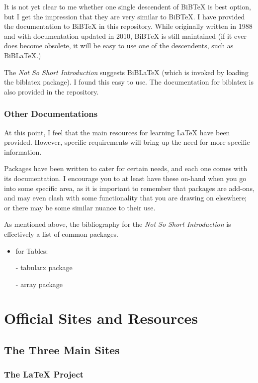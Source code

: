 \documentclass[11pt, oneside]{memoir}
\begin{document}
It is not yet clear to me whether one single descendent of BiBTeX is best option, but I get the impression that they are very similar to BiBTeX. I have provided the documentation to BiBTeX in this repository. While originally written in 1988 and with documentation updated in 2010, BiBTeX is still maintained (if it ever does become obsolete, it will be easy to use one of the descendents, such as BiBLaTeX.)

The \emph{Not So Short Introduction} suggests BiBLaTeX (which is invoked by loading the biblatex package). I found this easy to use. The documentation for biblatex is also provided in the repository.

\subsection{Other Documentations}
At this point, I feel that the main resources for learning LaTeX have been provided. However, specific requirements will bring up the need for more specific information. 

Packages have been written to cater for certain needs, and each one comes with its documentation. I encourage you to at least have these on-hand when you go into some specific area, as it is important to remember that packages are add-ons, and may even clash with some functionality that you are drawing on elsewhere; or there may be some similar nuance to their use.

As mentioned above, the bibliography for the \emph{Not So Short Introduction} is effectively a list of common packages.

\begin{itemize}
    \item for Tables:
    \item[-] tabularx package
    \item[-] array package
\end{itemize}

\chapter{Official Sites and Resources}

\section{The Three Main Sites}
\subsection{The LaTeX Project}
\end{document}

